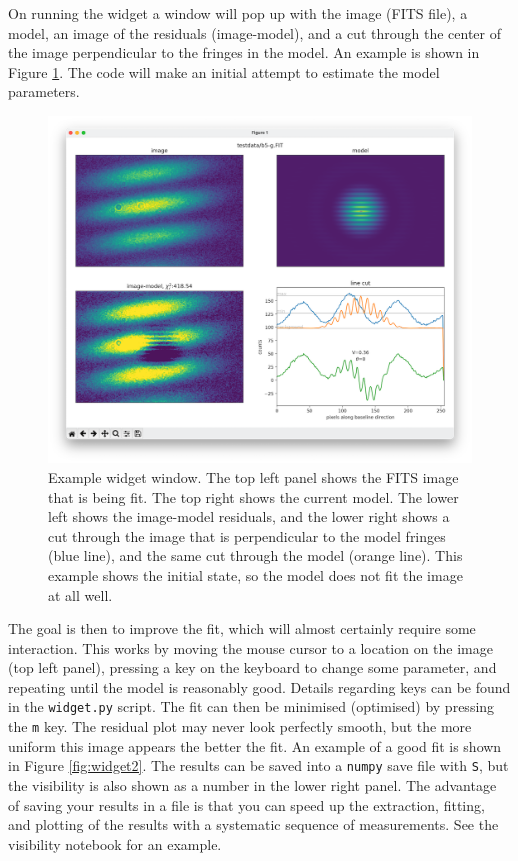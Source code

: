 \documentclass[11pt]{article}
\begin{document}
On running the widget a window will pop up with the image (FITS file), a model, an image of the residuals (image-model), and a cut through the center of the image perpendicular to the fringes in the model. An example is shown in Figure \ref{fig:widget}. The code will make an initial attempt to estimate the model parameters.

\begin{figure}[h!]
    \centering
    \includegraphics[width=1\textwidth]{widget.png}
    \caption{Example widget window. The top left panel shows the FITS image that is being fit. The top right shows the current model. The lower left shows the image-model residuals, and the lower right shows a cut through the image that is perpendicular to the model fringes (blue line), and the same cut through the model (orange line). This example shows the initial state, so the model does not fit the image at all well.}
    \label{fig:widget}
\end{figure}

The goal is then to improve the fit, which will almost certainly require some interaction. This works by moving the mouse cursor to a location on the image (top left panel), pressing a key on the keyboard to change some parameter, and repeating until the model is reasonably good. Details regarding keys can be found in the \texttt{widget.py} script. The fit can then be minimised (optimised) by pressing the \texttt{m} key. The residual plot may never look perfectly smooth, but the more uniform this image appears the better the fit. An example of a good fit is shown in Figure \ref{fig:widget2}. The results can be saved into a \texttt{numpy} save file with \texttt{S}, but the visibility is also shown as a number in the lower right panel. The advantage of saving your results in a file is that you can speed up the extraction, fitting, and plotting of the results with a systematic sequence of measurements. See the visibility notebook for an example.
\end{document}

